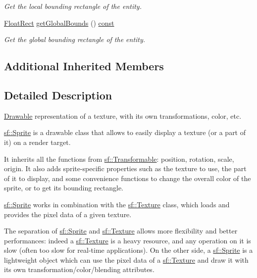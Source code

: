 \begin{DoxyCompactItemize}
\begin{DoxyCompactList}\small\item\em Get the local bounding rectangle of the entity. \end{DoxyCompactList}\item 
\hyperlink{namespacesf_ab0d978f5903922a6bdfca1736b71ccc9}{Float\-Rect} \hyperlink{classsf_1_1_sprite_a203d2d8087bfdca2ebc3c0485cdb7409}{get\-Global\-Bounds} () \hyperlink{term__entry_8h_a57bd63ce7f9a353488880e3de6692d5a}{const} 
\begin{DoxyCompactList}\small\item\em Get the global bounding rectangle of the entity. \end{DoxyCompactList}\end{DoxyCompactItemize}
\subsection*{Additional Inherited Members}


\subsection{Detailed Description}
\hyperlink{classsf_1_1_drawable}{Drawable} representation of a texture, with its own transformations, color, etc. 

\hyperlink{classsf_1_1_sprite}{sf\-::\-Sprite} is a drawable class that allows to easily display a texture (or a part of it) on a render target.

It inherits all the functions from \hyperlink{classsf_1_1_transformable}{sf\-::\-Transformable}\-: position, rotation, scale, origin. It also adds sprite-\/specific properties such as the texture to use, the part of it to display, and some convenience functions to change the overall color of the sprite, or to get its bounding rectangle.

\hyperlink{classsf_1_1_sprite}{sf\-::\-Sprite} works in combination with the \hyperlink{classsf_1_1_texture}{sf\-::\-Texture} class, which loads and provides the pixel data of a given texture.

The separation of \hyperlink{classsf_1_1_sprite}{sf\-::\-Sprite} and \hyperlink{classsf_1_1_texture}{sf\-::\-Texture} allows more flexibility and better performances\-: indeed a \hyperlink{classsf_1_1_texture}{sf\-::\-Texture} is a heavy resource, and any operation on it is slow (often too slow for real-\/time applications). On the other side, a \hyperlink{classsf_1_1_sprite}{sf\-::\-Sprite} is a lightweight object which can use the pixel data of a \hyperlink{classsf_1_1_texture}{sf\-::\-Texture} and draw it with its own transformation/color/blending attributes.

